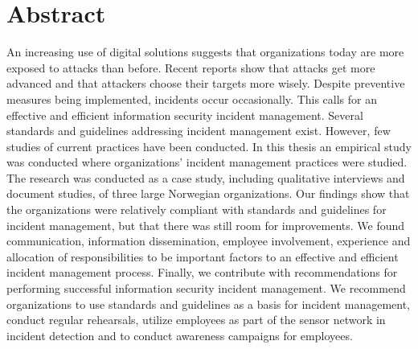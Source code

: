 \chapter*{Abstract}
An increasing use of digital solutions suggests that organizations today are more exposed to attacks than before. Recent reports show that attacks get more advanced and that attackers choose their targets more wisely. Despite preventive measures being implemented, incidents occur occasionally. This calls for an effective and efficient information security incident management. Several standards and guidelines addressing incident management exist. However, few studies of current practices have been conducted. In this thesis an empirical study was conducted where organizations' incident management practices were studied. The research was conducted as a case study, including qualitative interviews and document studies, of three large Norwegian organizations. Our findings show that the organizations were relatively compliant with standards and guidelines for incident management, but that there was still room for improvements. We found communication, information dissemination, employee involvement, experience and allocation of responsibilities to be important factors to an effective and efficient incident management process. Finally, we contribute with recommendations for performing successful information security incident management. We recommend organizations to use standards and guidelines as a basis for incident management, conduct regular rehearsals, utilize employees as part of the sensor network in incident detection and to conduct awareness campaigns for employees.
